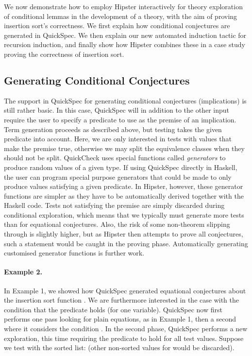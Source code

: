 \label{sec:conditionals}

We now demonstrate how to employ Hipster interactively for theory exploration of conditional lemmas in the development of a theory, with the aim of proving insertion sort's correctness.
%
We first explain how conditional conjectures are generated in QuickSpec.
%
We then explain our new automated induction tactic for recursion induction, and finally show how Hipster combines these in a case study proving the correctness of insertion sort.  

\subsection{Generating Conditional Conjectures}
The support in QuickSpec for generating conditional conjectures (implications) is still rather basic.
%
In this case, QuickSpec will in addition to the other input require the user to specify a predicate to use as the premise of an implication.
%
Term generation proceeds as described above, but testing takes the given predicate into account.
%
Here, we are only interested in tests with values that make the premise true, otherwise we may split the equivalence classes when they should not be split.
QuickCheck uses special functions called \emph{generators} to produce random values of a given type.
%
If using QuickSpec directly in Haskell, the user can program special purpose generators that could be made to only produce values satisfying a given predicate.
%
In Hipster, however, these generator functions are simpler as they have to be automatically derived together with the Haskell code.
%
Tests not satisfying the premise are simply discarded during conditional exploration, which means that we typically must generate more tests than for equational conjectures.
%
Also, the risk of some non-theorem slipping through is slightly higher, but as Hipster then attempts to prove all conjectures, such a statement would be caught in the proving phase.
%
Automatically generating customised generator functions is further work. 

\paragraph*{Example 2.}
\label{example2}
In Example 1, we showed how QuickSpec generated equational conjectures about the insertion sort function .
%
We are furthermore interested in the case with the condition that the predicate  holds (for one variable).
%
QuickSpec now first performs one pass looking for plain equations, as in Example 1, then a second where it considers the condition .
%
In the second phase, QuickSpec performs a new exploration, this time requiring the predicate  to hold for all test values.
%
Suppose we test with the sorted list:  (other non-sorted values for  would be discarded).       

